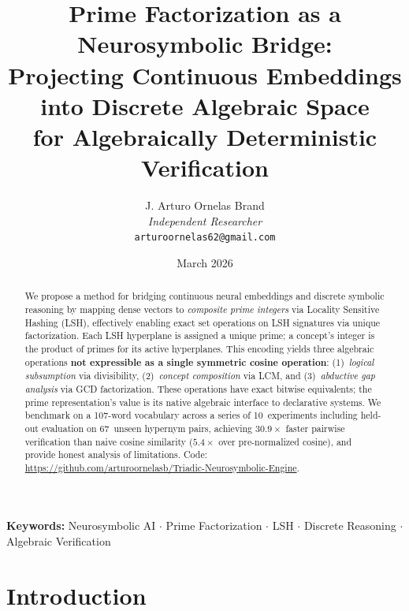 \documentclass[10pt]{article}
\begin{document}
\title{\Large Prime Factorization as a Neurosymbolic Bridge:\\ Projecting Continuous Embeddings into Discrete Algebraic Space\\ for Algebraically Deterministic Verification}

\author{J. Arturo Ornelas Brand \\ \textit{Independent Researcher} \\ \texttt{arturoornelas62@gmail.com}}
\date{March 2026}

\maketitle

\begin{abstract}
We propose a method for bridging continuous neural embeddings and discrete symbolic reasoning by mapping dense vectors to \emph{composite prime integers} via Locality Sensitive Hashing (LSH), effectively enabling exact set operations on LSH signatures via unique factorization. Each LSH hyperplane is assigned a unique prime; a concept's integer is the product of primes for its active hyperplanes. This encoding yields three algebraic operations \textbf{not expressible as a single symmetric cosine operation}: (1)~\emph{logical subsumption} via divisibility, (2)~\emph{concept composition} via LCM, and (3)~\emph{abductive gap analysis} via GCD factorization. These operations have exact bitwise equivalents; the prime representation's value is its native algebraic interface to declarative systems. We benchmark on a 107-word vocabulary across a series of 10~experiments including held-out evaluation on 67~unseen hypernym pairs, achieving $30.9\times$ faster pairwise verification than naive cosine similarity ($5.4\times$ over pre-normalized cosine), and provide honest analysis of limitations. Code: \url{https://github.com/arturoornelasb/Triadic-Neurosymbolic-Engine}.
\end{abstract}

\smallskip
\noindent\textbf{Keywords:} Neurosymbolic AI $\cdot$ Prime Factorization $\cdot$ LSH $\cdot$ Discrete Reasoning $\cdot$ Algebraic Verification

\section{Introduction}
\end{document}
